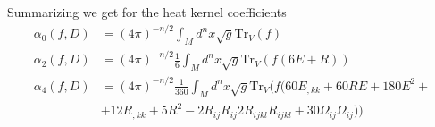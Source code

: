 Summarizing we get for the heat kernel coefficients
\begin{align}
    \alpha_0(f, D) &= (4\pi)^{-n/2}\int_M d^n x \sqrt{g} \text{Tr}_V(f)\\
    \alpha_2(f, D) &= (4\pi)^{-n/2}\frac{1}{6}\int_M d^n x \sqrt{g}
    \text{Tr}_V(f(6E+R))\\
    \alpha_4(f, D) &= (4\pi)^{-n/2}\frac{1}{360}\int_M d^n x \sqrt{g}
    \text{Tr}_V(f(60E_{,kk}+60RE+ 180E^2 +\\
    &+12R_{,kk} + 5R^2 - 2 R_{ij}R_{ij}
    2R_{ijkl}R_{ijkl} +30\Omega_{ij}\Omega_{ij}))\\
\end{align}

